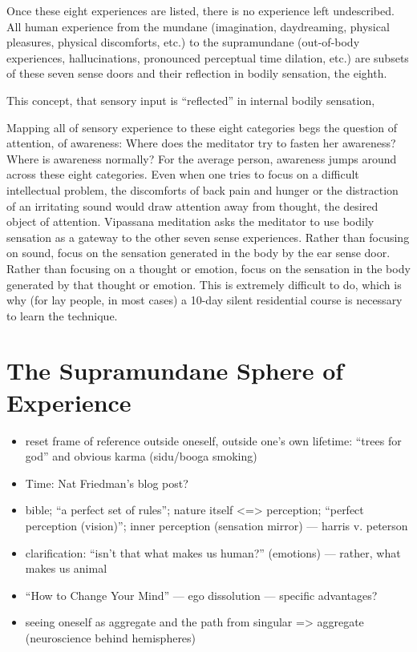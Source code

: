 \documentclass[a4paper, amsfonts, amssymb, amsmath, reprint, showkeys, nofootinbib, twoside]{revtex4-1}
\begin{document}
Once these eight experiences are listed, there is no experience left undescribed. All
human experience from the mundane (imagination, daydreaming, physical pleasures,
physical discomforts, etc.) to the supramundane (out-of-body experiences,
hallucinations, pronounced perceptual time dilation, etc.) are subsets of these seven
sense doors and their reflection in bodily sensation, the eighth.

This concept, that sensory input is ``reflected'' in internal bodily sensation,

Mapping all of sensory experience to these eight categories begs the question of
attention, of awareness: Where does the meditator try to fasten her awareness? Where
is awareness normally? For the average person, awareness jumps around across these
eight categories. Even when one tries to focus on a difficult intellectual problem,
the discomforts of back pain and hunger or the distraction of an irritating sound
would draw attention away from thought, the desired object of attention. Vipassana
meditation asks the meditator to use bodily sensation as a gateway to the other seven
sense experiences. Rather than focusing on sound, focus on the sensation generated in
the body by the ear sense door. Rather than focusing on a thought or emotion, focus
on the sensation in the body generated by that thought or emotion. This is extremely
difficult to do, which is why (for lay people, in most cases) a 10-day silent
residential course \cite{dhamma} is necessary to learn the technique.

\section{The Supramundane Sphere of Experience}

\begin{itemize}
  \item reset frame of reference outside oneself, outside one's own lifetime: ``trees
    for god'' and obvious karma (sidu/booga smoking)
  \item Time: Nat Friedman's blog post?
  \item bible; ``a perfect set of rules''; nature itself <=> perception; ``perfect
    perception (vision)''; inner perception (sensation mirror) --- harris v. peterson
  \item clarification: ``isn't that what makes us human?'' (emotions) --- rather,
    what makes us animal
  \item ``How to Change Your Mind'' --- ego dissolution --- specific advantages?
  \item seeing oneself as aggregate and the path from singular => aggregate
    (neuroscience behind hemispheres)
\end{itemize}
\end{document}
